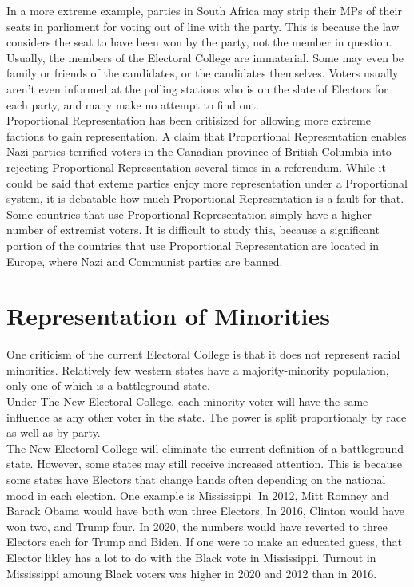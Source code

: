 \documentclass{article}
\begin{document}
    In a more extreme example, parties in South Africa may strip their MPs of their seats in parliament for voting out of line with the party. This is because the law considers the seat to have been won by the party, not the member in question.\\

    Usually, the members of the Electoral College are immaterial. Some may even be family or friends of the candidates, or the candidates themselves. Voters usually aren't even informed at the polling stations who is on the slate of Electors for each party, and many make no attempt to find out.\\

    Proportional Representation has been critisized for allowing more extreme factions to gain representation. A claim that Proportional Representation enables Nazi parties terrified voters in the Canadian province of British Columbia into rejecting Proportional Representation several times in a referendum. While it could be said that exteme parties enjoy more representation under a Proportional system, it is debatable how much Proportional Representation is a fault for that. Some countries that use Proportional Representation simply have a higher number of extremist voters. It is difficult to study this, because a significant portion of the countries that use Proportional Representation are located in Europe, where Nazi and Communist parties are banned.\\

    \section{Representation of Minorities}%

    One criticism of the current Electoral College is that it does not represent racial minorities. Relatively few western states have a majority-minority population, only one of which is a battleground state.\\

    Under The New Electoral College, each minority voter will have the same influence as any other voter in the state. The power is split proportionaly by race as well as by party.\\

    The New Electoral College will eliminate the current definition of a battleground state. However, some states may still receive increased attention. This is because some states have Electors that change hands often depending on the national mood in each election. One example is Mississippi. In 2012, Mitt Romney and Barack Obama would have both won three Electors. In 2016, Clinton would have won two, and Trump four. In 2020, the numbers would have reverted to three Electors each for Trump and Biden. If one were to make an educated guess, that Elector likley has a lot to do with the Black vote in Mississippi. Turnout in Mississippi amoung Black voters was higher in 2020 and 2012 than in 2016.\\
\end{document}
